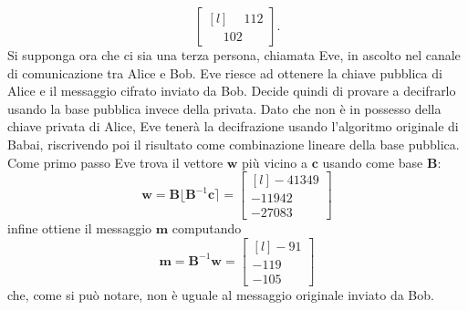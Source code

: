 \begin{exmp}
\[\begin{bmatrix*}[l]
        \phantom{-}112 \\
        \phantom{-}102
    \end{bmatrix*}.
\]
Si supponga ora che ci sia una terza persona, chiamata Eve, in ascolto nel canale di 
comunicazione tra Alice e Bob. Eve riesce ad ottenere la chiave pubblica di Alice e il 
messaggio cifrato inviato da Bob. Decide quindi di provare a decifrarlo usando la base 
pubblica invece della privata. 
Dato che non è in possesso della chiave privata di Alice, Eve tenerà la 
decifrazione usando l'algoritmo originale di Babai, riscrivendo poi il risultato come 
combinazione lineare della base pubblica. 
\\
Come primo passo Eve trova il vettore $\mathbf{w}$
più vicino a $\mathbf{c}$ usando come base $\mathbf{B}$:
\[
    \mathbf{w} = \mathbf{B} \lfloor \mathbf{B}^{-1}\mathbf{c}\rceil = 
    \begin{bmatrix*}[l]
        -41349 \\
        -11942 \\
        -27083 
    \end{bmatrix*}
\]
infine ottiene il messaggio $\mathbf{m}$ computando
\[
    \mathbf{m} = \mathbf{B}^{-1}\mathbf{w} = 
    \begin{bmatrix*}[l]
        -91 \\
        -119 \\
        -105 
    \end{bmatrix*}
\]
che, come si può notare, non è uguale al messaggio originale inviato da Bob. 
\end{exmp}